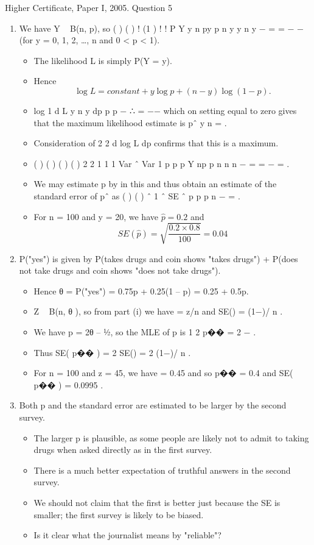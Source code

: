 \documentclass[a4paper,12pt]{article}
\begin{document}
Higher Certificate, Paper I, 2005. Question 5

\begin{enumerate}
\item We have Y ~ B(n, p), so ( ) ( ) ! (1 )
! !
P Y y n py p n y
y n y
− = = −
−
(for y = 0, 1, 2, …, n
and 0 < p < 1). 
\begin{itemize}
\item
The likelihood L is simply P(Y = y).
\item
Hence \[\log L = constant + y \log p + (n − y)\log(1− p).\]
\item 
log
1
d L y n y
dp p p
− ∴ = −−
which on setting equal to zero gives that the maximum
likelihood estimate is pˆ y
n
= . 

\item Consideration of
2
2
d log L
dp
confirms that this is a
maximum.

\item 
( ) ( ) ( ) ( )
2 2
1 1 1 Var ˆ Var 1
p p
p Y np p
n n n
−
= = − = . 
\item We may estimate p by  in this and
thus obtain an estimate of the standard error of pˆ as ( ) ( ) ˆ 1 ˆ
SE ˆ
p p
p
n
−
= .
\item 
For n = 100 and y = 20, we have $\hat{p} = 0.2$ and 
\[SE( \hat{p} )  =  \sqrt{ \frac{0.2 \times 0.8}{100} } = 0.04\]
\end{itemize}
\item P("yes") is given by P(takes drugs and coin shows "takes drugs") + P(does not
take drugs and coin shows "does not take drugs").
\begin{itemize}
    \item Hence θ = P("yes") = 0.75p + 0.25(1 – p) = 0.25 + 0.5p.
    \item Z ~ B(n, θ ), so from part (i) we have  = z/n and SE() =  (1−)/ n .
    \item We have p = 2θ – ½, so the MLE of p is 1
2
p�� = 2 − .
    \item Thus SE( p�� ) = 2 SE() = 2  (1−)/ n .
    \item For n = 100 and z = 45, we have  = 0.45 and so p�� = 0.4 and SE( p�� ) = 0.0995 .
\end{itemize}

\item Both p and the standard error are estimated to be larger by the second survey.
\begin{itemize}
    \item The larger p is plausible, as some people are likely not to admit to taking drugs when
asked directly as in the first survey.
    \item There is a much better expectation of truthful
answers in the second survey.
    \item We should not claim that the first is better just because
the SE is smaller; the first survey is likely to be biased. 
    \item Is it clear what the journalist
means by "reliable"?
\end{itemize}

\end{enumerate}
\end{document}
